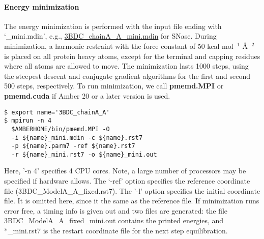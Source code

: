 \paragraph{Energy minimization}
The energy minimization is performed
with the input file ending with `\_mini.mdin',
e.g., 
\href{https://gitlab.com/shenlab-amber-cphmd/cphmd-tutorial/-/blob/main/gphmd_Amber/gphmd_snase_phrex/3BDC/3BDC_chainA_A_mini.mdin}{3BDC\_chainA\_A\_mini.mdin} for SNase.
During minimization, a harmonic restraint with the
force constant of 50 kcal mol$^{-1}$ \AA$^{-2}$ is placed
on all protein heavy atoms, except for the 
terminal and capping residues where all atoms are allowed to move. 
The minimization lasts 1000 steps, using the steepest descent and 
conjugate gradient algorithms for the first and second 500 steps, respectively. 
To run minimization, we call \textbf{pmemd.MPI} or \textbf{pmemd.cuda} if Amber 20 \cite{Case_Kollman_2021_Amber20} or a later version is used.
\begin{lstlisting}
$ export name='3BDC_chainA_A'
$ mpirun -n 4 
  $AMBERHOME/bin/pmemd.MPI -O 
  -i ${name}_mini.mdin -c ${name}.rst7 
  -p ${name}.parm7 -ref ${name}.rst7 
  -r ${name}_mini.rst7 -o ${name}_mini.out
\end{lstlisting}
Here, '-n 4' specifies 4 CPU cores. Note, a large number of processors may be specified if hardware allows. 
The `-ref' option 
specifies the reference coordinate file
(3BDC\_ModelA\_A\_fixed.rst7).
The '-l' option specifies the initial coordinate file. It is omitted here, since it the same as the reference file.
If minimization runs error free, a timing info is given out
and two files are generated: 
the file 3BDC\_ModelA\_A\_fixed\_mini.out 
contains the printed energies, and 
*\_mini.rst7 is the restart coordinate file for the next step equilibration. 


